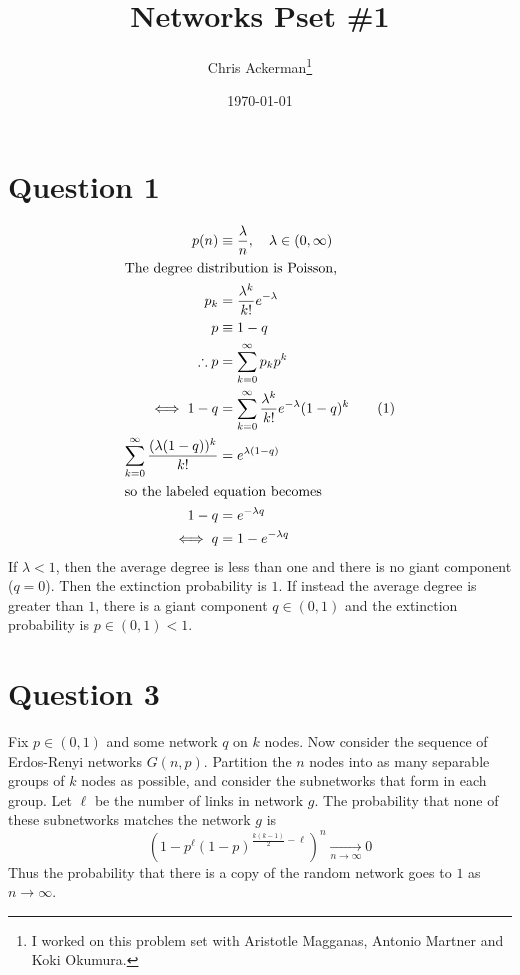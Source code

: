 
\newtheorem*{definition}{Definition}
\title{Networks Pset \#1}
\date{\today}

\author{Chris Ackerman\thanks{I worked on this problem set with Aristotle Magganas, Antonio Martner and Koki Okumura.}}

\maketitle
\section*{Question 1}
\begin{align*}
  p(n) &\equiv \frac{\lambda}{n}, \quad \lambda \in (0, \infty)\\
  \intertext{The degree distribution is Poisson, }
  p_k &= \frac{\lambda^k}{k!} e^{- \lambda}\\
  p &\equiv 1 - q\\
  \therefore p&= \sum^\infty_{k = 0} p_k p^k\\
  \iff 1 - q &= \sum^\infty_{k = 0} \frac{\lambda^k}{k!}e^{-\lambda} (1 - q)^k \tag{1}\\
  \sum^\infty_{k = 0} \frac{(\lambda (1 - q))^k}{k!} &= e^{\lambda(1 - q)}\\
  \intertext{so the labeled equation becomes}
  1 - q &= e^{-\lambda q}\\
  \iff q &= 1 - e^{-\lambda q}
\end{align*}
If $\lambda <1$, then the average degree is less than one and there is no giant component ($q = 0$). Then the extinction probability is $1$. If instead the average degree is greater than $1$, there is a giant component $q \in (0, 1)$ and the extinction probability is $p \in (0, 1) < 1 $.
\section*{Question 3}
Fix $p \in (0, 1)$ and some network $q$ on $k$ nodes. Now consider the sequence of Erdos-Renyi networks $G(n, p)$. Partition the $n$ nodes into as many separable groups of $k$ nodes as possible, and consider the subnetworks that form in each group. Let $\ell$ be the number of links in network $g$. The probability that none of these subnetworks matches the network $g$ is
\[
\left(1 - p^\ell (1- p )^{\frac{k(k - 1)}{2} - \ell}\right)^n \underset{n \to \infty}{\to} 0
\]
Thus the probability that there is a copy of the random network goes to $1$ as $n \to \infty$.
